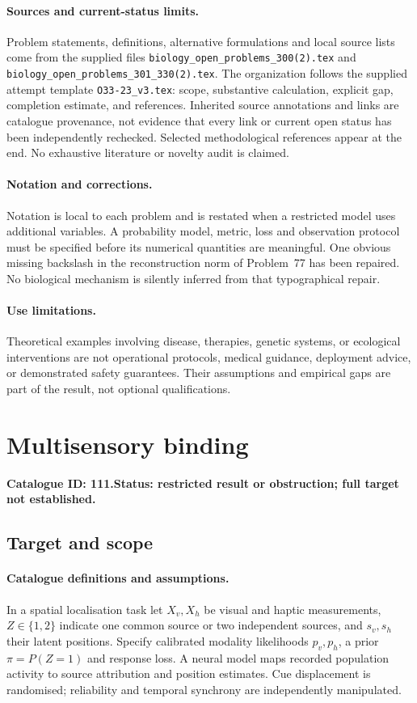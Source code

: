 \documentclass[11pt]{article}
\begin{document}
\paragraph{Sources and current-status limits.}
Problem statements, definitions, alternative formulations and local source lists
come from the supplied files
\texttt{biology\_open\_problems\_300(2).tex} and
\texttt{biology\_open\_problems\_301\_330(2).tex}.
The organization follows the supplied attempt template
\texttt{O33-23\_v3.tex}: scope, substantive calculation, explicit gap,
completion estimate, and references. Inherited source annotations and links are
catalogue provenance, not evidence that every link or current open status has
been independently rechecked. Selected methodological references appear at the
end. No exhaustive literature or novelty audit is claimed.

\paragraph{Notation and corrections.}
Notation is local to each problem and is restated when a restricted model uses
additional variables. A probability model, metric, loss and observation protocol
must be specified before its numerical quantities are meaningful. One obvious
missing backslash in the reconstruction norm of Problem~77 has been repaired.
No biological mechanism is silently inferred from that typographical repair.

\paragraph{Use limitations.}
Theoretical examples involving disease, therapies, genetic systems, or ecological
interventions are not operational protocols, medical guidance, deployment advice,
or demonstrated safety guarantees. Their assumptions and empirical gaps are part
of the result, not optional qualifications.

\setcounter{section}{110}
\section{Multisensory binding}
\label{prob:111}
\noindent\textbf{Catalogue ID: 111.}\quad \textbf{Status: restricted result or obstruction; full target not established.}
\subsection{Target and scope}
\paragraph{Catalogue definitions and assumptions.}
In a spatial localisation task let $X_v,X_h$ be visual and haptic measurements, $Z\in\{1,2\}$ indicate one common source or two independent sources, and $s_v,s_h$ their latent positions. Specify calibrated modality likelihoods $p_v,p_h$, a prior $\pi=P(Z=1)$ and response loss. A neural model maps recorded population activity to source attribution and position estimates. Cue displacement is randomised; reliability and temporal synchrony are independently manipulated.
\end{document}
